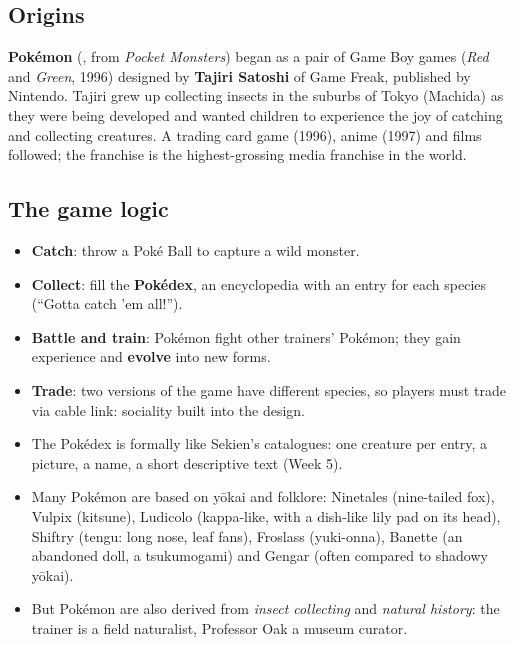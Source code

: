 \subsection{Origins}

\textbf{Pokémon} (, from \emph{Pocket Monsters}) began as a pair of Game Boy games
(\emph{Red} and \emph{Green}, 1996) designed by \textbf{Tajiri Satoshi} of Game Freak, published
by Nintendo. Tajiri grew up collecting insects in the suburbs of Tokyo (Machida) as they
were being developed and wanted children to experience the joy of catching and collecting
creatures. A trading card game (1996), anime (1997) and films followed; the franchise is the
highest-grossing media franchise in the world.

\subsection{The game logic}

\begin{itemize}
  \item \textbf{Catch}: throw a Poké Ball to capture a wild monster.
  \item \textbf{Collect}: fill the \textbf{Pokédex}, an encyclopedia with an entry for
        each species (``Gotta catch 'em all!'').
  \item \textbf{Battle and train}: Pokémon fight other trainers' Pokémon; they gain
        experience and \textbf{evolve} into new forms.
  \item \textbf{Trade}: two versions of the game have different species, so players must
        trade via cable link: sociality built into the design.
\end{itemize}

\begin{important}
\begin{itemize}
  \item The Pokédex is formally like Sekien's catalogues: one creature per entry, a picture,
        a name, a short descriptive text (Week 5).
  \item Many Pokémon are based on yōkai and folklore: Ninetales (nine-tailed fox), Vulpix
        (kitsune), Ludicolo (kappa-like, with a dish-like lily pad on its head), Shiftry
        (tengu: long nose, leaf fans), Froslass (yuki-onna), Banette (an abandoned doll,
        a tsukumogami) and Gengar (often compared to shadowy yōkai).
  \item But Pokémon are also derived from \emph{insect collecting} and \emph{natural history}:
        the trainer is a field naturalist, Professor Oak a museum curator.
\end{itemize}
\end{important}

